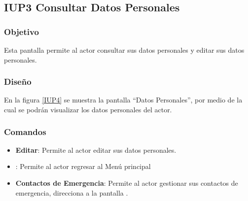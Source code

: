 \subsection{IUP3 Consultar Datos Personales}
 
\subsubsection{Objetivo}

    Esta pantalla permite al actor consultar sus datos personales y editar sus datos personales.

\subsubsection{Diseño}

    En la figura \ref{IUP4} se muestra la pantalla ``Datos Personales'', por medio de la cual se podrán visualizar los datos personales del actor. \\


\subsubsection{Comandos}
\begin{itemize}
    \item \textbf{Editar}: Permite al actor editar sus datos personales.
    \item {}: Permite al actor regresar al Menú principal
    \item \textbf{Contactos de Emergencia}: Permite al actor gestionar sus contactos de emergencia, direcciona a la pantalla .
\end{itemize}

%
